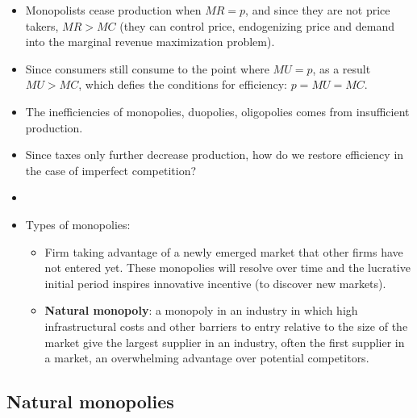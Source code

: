 \documentclass[
]{ltjarticle}
\providecommand{\tightlist}{%
  \setlength{\itemsep}{0pt}\setlength{\parskip}{0pt}}
\begin{document}
\begin{itemize}
\item
  Monopolists cease production when \(MR = p\), and since they are not
  price takers, \(MR > MC\) (they can control price, endogenizing price
  and demand into the marginal revenue maximization problem).\\
\item
  Since consumers still consume to the point where \(MU = p\), as a
  result \(MU > MC\), which defies the conditions for efficiency:
  \(p = MU = MC\).\\
\item
  The inefficiencies of monopolies, duopolies, oligopolies comes from
  insufficient production.\\
\item
  Since taxes only further decrease production, how do we restore
  efficiency in the case of imperfect competition?\\
\item
\item
  Types of monopolies:

  \begin{itemize}
  \tightlist
  \item
    Firm taking advantage of a newly emerged market that other firms
    have not entered yet. These monopolies will resolve over time and
    the lucrative initial period inspires innovative incentive (to
    discover new markets).\\
  \item
    \textbf{Natural monopoly}: a monopoly in an industry in which high
    infrastructural costs and other barriers to entry relative to the
    size of the market give the largest supplier in an industry, often
    the first supplier in a market, an overwhelming advantage over
    potential competitors.
  \end{itemize}
\end{itemize}

\hypertarget{natural-monopolies}{%
\subsection{Natural monopolies}\label{natural-monopolies}}
\end{document}
